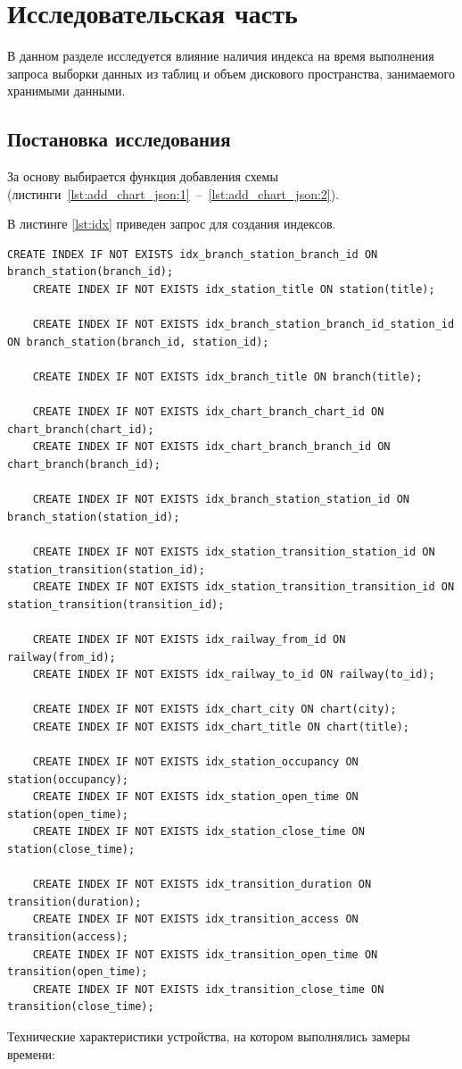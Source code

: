\chapter{Исследовательская часть}

В данном разделе исследуется влияние наличия индекса на время выполнения запроса выборки данных из таблиц и объем дискового пространства, занимаемого хранимыми данными.

\section{Постановка исследования}

За основу выбирается функция добавления схемы (листинги~\ref{lst:add_chart_json:1}~--~\ref{lst:add_chart_json:2}). 

В листинге \ref{lst:idx} приведен запрос для создания индексов.

\begin{lstlisting}[label=lst:idx,caption=запрос для создания индексов]
    CREATE INDEX IF NOT EXISTS idx_branch_station_branch_id ON branch_station(branch_id);
    CREATE INDEX IF NOT EXISTS idx_station_title ON station(title);
    
    CREATE INDEX IF NOT EXISTS idx_branch_station_branch_id_station_id ON branch_station(branch_id, station_id);
    
    CREATE INDEX IF NOT EXISTS idx_branch_title ON branch(title);
    
    CREATE INDEX IF NOT EXISTS idx_chart_branch_chart_id ON chart_branch(chart_id);
    CREATE INDEX IF NOT EXISTS idx_chart_branch_branch_id ON chart_branch(branch_id);
    
    CREATE INDEX IF NOT EXISTS idx_branch_station_station_id ON branch_station(station_id);
    
    CREATE INDEX IF NOT EXISTS idx_station_transition_station_id ON station_transition(station_id);
    CREATE INDEX IF NOT EXISTS idx_station_transition_transition_id ON station_transition(transition_id);
    
    CREATE INDEX IF NOT EXISTS idx_railway_from_id ON railway(from_id);
    CREATE INDEX IF NOT EXISTS idx_railway_to_id ON railway(to_id);
    
    CREATE INDEX IF NOT EXISTS idx_chart_city ON chart(city);
    CREATE INDEX IF NOT EXISTS idx_chart_title ON chart(title);
    
    CREATE INDEX IF NOT EXISTS idx_station_occupancy ON station(occupancy);
    CREATE INDEX IF NOT EXISTS idx_station_open_time ON station(open_time);
    CREATE INDEX IF NOT EXISTS idx_station_close_time ON station(close_time);
    
    CREATE INDEX IF NOT EXISTS idx_transition_duration ON transition(duration);
    CREATE INDEX IF NOT EXISTS idx_transition_access ON transition(access);
    CREATE INDEX IF NOT EXISTS idx_transition_open_time ON transition(open_time);
    CREATE INDEX IF NOT EXISTS idx_transition_close_time ON transition(close_time);
\end{lstlisting}
Технические характеристики устройства, на котором выполнялись замеры времени:

